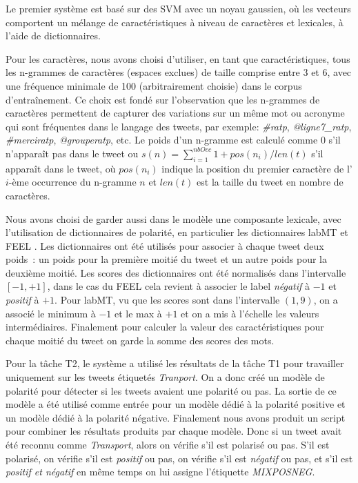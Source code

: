 
Le premier système est basé sur des SVM avec un noyau gaussien, où les vecteurs comportent un mélange de caractéristiques à niveau de caractères et lexicales, à l'aide de dictionnaires.

Pour les caractères, nous avons choisi d'utiliser, en tant que caractéristiques, tous les n-grammes de caractères (espaces exclues) de taille comprise entre 3 et 6, avec une fréquence minimale de 100 (arbitrairement choisie) dans le corpus d’entraînement.
Ce choix est fondé sur l'observation que les n-grammes de caractères permettent de capturer des variations sur un même mot ou acronyme qui sont fréquentes dans le langage des tweets, par exemple: \emph{\#ratp}, \emph{@ligne7\_ratp}, \emph{\#merciratp}, \emph{@grouperatp}, etc.
Le poids d'un n-gramme est calculé comme 0 s'il n'apparaît pas dans le tweet ou $s(n)= \sum_{i=1}^{nbOcc} 1 + pos(n_i)/len(t)$ s'il apparaît dans le tweet, où $pos(n_i)$ indique la position du premier caractère de l'$i$-ème occurrence du n-gramme $n$ et $len(t)$ est la taille du tweet en nombre de caractères.

Nous avons choisi de garder aussi dans le modèle une composante lexicale, avec l'utilisation de dictionnaires de polarité, en particulier les dictionnaires labMT \cite{dodds2011} et FEEL \cite{abdaoui2017}.
Les dictionnaires ont été utilisés pour associer à chaque tweet deux poids~: un poids pour la première moitié du tweet et un autre poids pour la deuxième moitié.
Les scores des dictionnaires ont été normalisés dans l'intervalle $[-1, +1]$, dans le cas du FEEL cela revient à associer le label \emph{négatif} à $-1$ et \emph{positif} à $+1$.
Pour labMT, vu que les scores sont dans l'intervalle $(1,9)$, on a associé le minimum à $-1$ et le max à $+1$ et on a mis à l'échelle les valeurs intermédiaires. Finalement pour calculer la valeur des caractéristiques pour chaque moitié du tweet on garde la somme des scores des mots.

Pour la tâche T2, le système a utilisé les résultats de la tâche T1 pour travailler uniquement sur les tweets étiquetés \emph{Tranport}.
On a donc créé un modèle de polarité pour détecter si les tweets avaient une polarité ou pas.
La sortie de ce modèle a été utilisé comme entrée pour un modèle dédié à la polarité positive et un modèle dédié à la polarité négative.
Finalement nous avons produit un script pour combiner les résultats produits par chaque modèle.
Donc si un tweet avait été reconnu comme \emph{Transport}, alors on vérifie s'il est polarisé ou pas.
S'il est polarisé, on vérifie s'il est \emph{positif} ou pas, on vérifie s'il est \emph{négatif} ou pas, et s'il est \emph{positif et négatif} en même temps on lui assigne l'étiquette \emph{MIXPOSNEG}.

